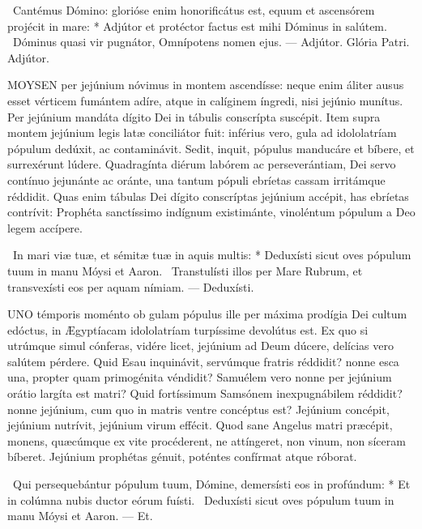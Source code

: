 \R\ Cantémus Dómino: glorióse enim honorificátus est, equum et ascensórem projécit in mare: * Adjútor et protéctor factus est mihi Dóminus in salútem. \V\ Dóminus quasi vir pugnátor, Omnípotens nomen ejus. --- Adjútor. Glória Patri. Adjútor.





\lettrine[lines=2]{M}{OYSEN} per jejúnium nóvimus in montem ascendísse: neque enim áliter ausus esset vérticem fumántem adíre, atque in calíginem íngredi, nisi jejúnio munítus. Per jejúnium mandáta dígito Dei in tábulis conscrípta suscépit. Item supra montem jejúnium legis latæ conciliátor fuit: inférius vero, gula ad idololatríam pópulum dedúxit, ac contaminávit. Sedit, inquit, pópulus manducáre et bíbere, et surrexérunt lúdere. Quadragínta diérum labórem ac perseverántiam, Dei servo contínuo jejunánte ac oránte, una tantum pópuli ebríetas cassam irritámque réddidit. Quas enim tábulas Dei dígito conscríptas jejúnium accépit, has ebríetas contrívit: Prophéta sanctíssimo indígnum existimánte, vinoléntum pópulum a Deo legem accípere.

\R\ In mari viæ tuæ, et sémitæ tuæ in aquis multis: * Deduxísti sicut oves pópulum tuum in manu Móysi et Aaron. \V\ Transtulísti illos per Mare Rubrum, et transvexísti eos per aquam nímiam. --- Deduxísti.


\lettrine[lines=2]{U}{NO} témporis moménto ob gulam pópulus ille per máxima prodígia Dei cultum edóctus, in Ægyptíacam idololatríam turpíssime devolútus est. Ex quo si utrúmque simul cónferas, vidére licet, jejúnium ad Deum dúcere, delícias vero salútem pérdere. Quid Esau inquinávit, servúmque fratris réddidit? nonne esca una, propter quam primogénita véndidit? Samuélem vero nonne per jejúnium orátio largíta est matri? Quid fortíssimum Samsónem inexpugnábilem réddidit? nonne jejúnium, cum quo in matris ventre concéptus est? Jejúnium concépit, jejúnium nutrívit, jejúnium virum effécit. Quod sane Angelus matri præcépit, monens, quæcúmque ex vite procéderent, ne attíngeret, non vinum, non síceram bíberet. Jejúnium prophétas génuit, poténtes confírmat atque róborat.

\R\ Qui persequebántur pópulum tuum, Dómine, demersísti eos in profúndum: * Et in colúmna nubis ductor eórum fuísti. \V\ Deduxísti sicut oves pópulum tuum in manu Móysi et Aaron. --- Et.

